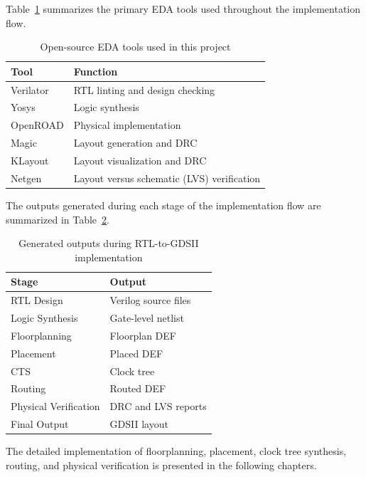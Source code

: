 Table~\ref{tab:eda_tools} summarizes the primary EDA tools used throughout the implementation flow.

\begin{table}[!htbp]
\centering
\caption{Open-source EDA tools used in this project}
\label{tab:eda_tools}
\begin{tabular}{ll}
\toprule
Tool & Function\\
\midrule
Verilator & RTL linting and design checking\\
Yosys & Logic synthesis\\
OpenROAD & Physical implementation\\
Magic & Layout generation and DRC\\
KLayout & Layout visualization and DRC\\
Netgen & Layout versus schematic (LVS) verification\\
\bottomrule
\end{tabular}
\end{table}

The outputs generated during each stage of the implementation flow are summarized in Table~\ref{tab:outputs}.

\begin{table}[!htbp]
\centering
\caption{Generated outputs during RTL-to-GDSII implementation}
\label{tab:outputs}
\begin{tabular}{ll}
\toprule
Stage & Output\\
\midrule
RTL Design & Verilog source files\\
Logic Synthesis & Gate-level netlist\\
Floorplanning & Floorplan DEF\\
Placement & Placed DEF\\
CTS & Clock tree\\
Routing & Routed DEF\\
Physical Verification & DRC and LVS reports\\
Final Output & GDSII layout\\
\bottomrule
\end{tabular}
\end{table}

The detailed implementation of floorplanning, placement, clock tree synthesis, routing, and physical verification is presented in the following chapters.